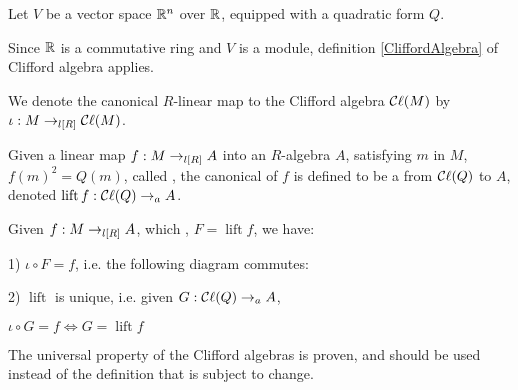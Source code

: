 \begin{example}
  \label{ex:clifford_algebra_v}

  Let $V$ be a vector space $\mathbb R^n$ over $\mathbb R$, equipped with a quadratic form $Q$.
  
  Since $\mathbb R$ is a commutative ring and $V$ is a module,
  definition \ref{CliffordAlgebra} of Clifford algebra applies.
\end{example}

\begin{definition}
  \label{iota}
  \leanok

  We denote the canonical $R$-linear map to the Clifford algebra $\mathop{\mathcal{C}\ell}(M)$ by $\iota : M \to_{l[R]} \mathop{\mathcal{C}\ell}(M)$.

\end{definition}

\begin{definition}
  \label{lift}
  \leanok

  Given a linear map $f : M \to_{l[R]} A$ into an $R$-algebra $A$, satisfying \forall $m$ in $M$, $f(m)^2 = Q(m)$,
  called ,
  the canonical  of $f$ is defined to be a  from $\mathop{\mathcal{C}\ell}(Q)$ to $A$,
  denoted $\operatorname{lift} f : \mathop{\mathcal{C}\ell}(Q) \to_{a} A$.

\end{definition}

\begin{theorem}
  \label{univ}
  \leanok

  Given $f : M \to_{l[R]} A$, which , $F = \operatorname{lift} f$, we have:

  1) $\iota \circ F = f$, i.e. the following diagram commutes:

  \begin{figure}[H]
    \centering
  \end{figure}

  2) $\operatorname{lift}$ is unique, i.e. given $G : \mathop{\mathcal{C}\ell}(Q) \to_{a} A$, 

  $\iota \circ G = f \iff G = \operatorname{lift} f$

\end{theorem}

\begin{remark}
  \label{mk:univ}

The universal property of the Clifford algebras is proven, and should be used instead of the definition
that is subject to change.

\end{remark}
